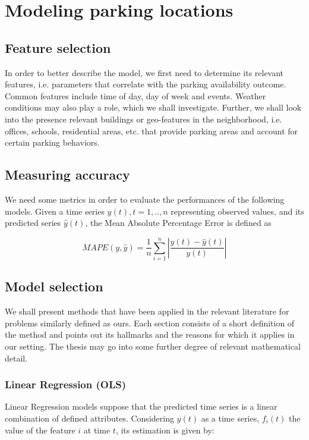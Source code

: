 \documentclass{article}
\begin{document}
\section{Modeling parking locations}
\subsection{Feature selection}
In order to better describe the model, we first need to determine its relevant features, i.e. parameters that correlate with the parking availability outcome. Common features include time of day, day of week and events\cite{Caicedo}\cite{Chen}\cite{Hoessinger2014}. Weather conditions may also play a role, which we shall investigate. Further, we shall look into the presence relevant buildings or geo-features in the neighborhood, i.e. offices, schools, residential areas, etc. that provide parking areas and account for certain parking behaviors.

\subsection{Measuring accuracy}
We need some metrics in order to evaluate the performances of the following models. Given a time series 
$y(t), t=1,..,n$ representing observed values, and its predicted series $\hat{y}(t)$, the Mean Absolute Percentage Error is defined as \cite{Chen}\cite{Rajabioun}

$$MAPE(y, \hat{y}) = \frac{1}{n}\sum_{i=1}^{n}|\frac{y(t) - \hat{y}(t)}{y(t)}|$$

\subsection{Model selection}
We shall present methods that have been applied in the relevant literature for problems similarly defined as ours. Each section consists of a short definition of the method and points out its hallmarks and the reasons for which it applies in our setting. The thesis may go into some further degree of relevant mathematical detail.

\subsubsection{Linear Regression (OLS)}
Linear Regression models suppose that the predicted time series is a linear combination of defined attributes. Considering $y(t)$ as a time series, $f_i(t)$ the value of the feature $i$ at time $t$, its estimation is given by:
\end{document}
